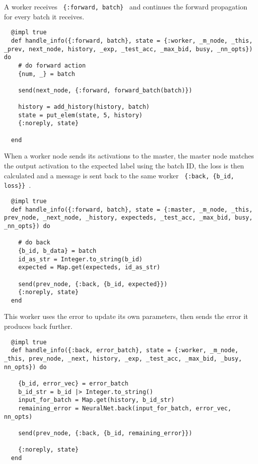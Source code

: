 A worker receives \lstinline| {:forward, batch} | and continues the forward
propagation for every batch it receives.
\begin{lstlisting}
  @impl true
  def handle_info({:forward, batch}, state = {:worker, _m_node, _this, _prev, next_node, history, _exp, _test_acc, _max_bid, busy, _nn_opts}) do
    # do forward action
    {num, _} = batch

    send(next_node, {:forward, forward_batch(batch)})

    history = add_history(history, batch)
    state = put_elem(state, 5, history)
    {:noreply, state}

  end
\end{lstlisting}

When a worker node sends its activations to the master, the master node matches
the output activation to the expected label using the batch ID, the loss is then
calculated and a message is sent back to the same worker \lstinline| {:back, {b_id, loss}} |.
\begin{lstlisting}
  @impl true
  def handle_info({:forward, batch}, state = {:master, _m_node, _this, prev_node, _next_node, _history, expecteds, _test_acc, _max_bid, busy, _nn_opts}) do

    # do back
    {b_id, b_data} = batch
    id_as_str = Integer.to_string(b_id)
    expected = Map.get(expecteds, id_as_str)

    send(prev_node, {:back, {b_id, expected}})
    {:noreply, state}
  end
\end{lstlisting}

This worker uses the error to update its own parameters, then
sends the error it produces back further.
\begin{lstlisting}
  @impl true
  def handle_info({:back, error_batch}, state = {:worker, _m_node, _this, prev_node, _next, history, _exp, _test_acc, _max_bid, _busy, nn_opts}) do

    {b_id, error_vec} = error_batch
    b_id_str = b_id |> Integer.to_string()
    input_for_batch = Map.get(history, b_id_str)
    remaining_error = NeuralNet.back(input_for_batch, error_vec, nn_opts)

    send(prev_node, {:back, {b_id, remaining_error}})

    {:noreply, state}
  end
\end{lstlisting}

